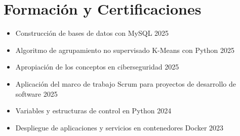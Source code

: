 \documentclass[9pt,letterpaper]{extarticle}
\begin{document}
	\section*{Formación y Certificaciones}
	\begin{itemize}
		\item Construcción de bases de datos con MySQL \hfill 2025
		\item Algoritmo de agrupamiento no supervisado K-Means con Python \hfill 2025
		\item Apropiación de los conceptos en ciberseguridad \hfill 2025
		\item Aplicación del marco de trabajo Scrum para proyectos de desarrollo de software \hfill 2025
		\item Variables y estructuras de control en Python \hfill 2024
		\item Despliegue de aplicaciones y servicios en contenedores Docker \hfill 2023
	\end{itemize}
	
\end{document}
